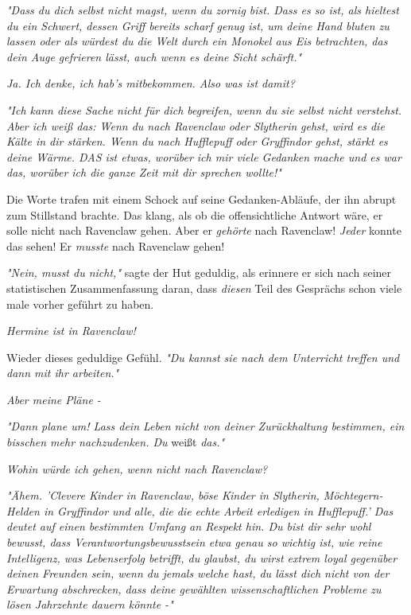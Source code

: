 {\emph{"Dass du dich selbst nicht magst, wenn du zornig bist. Dass es so ist, als hieltest du ein Schwert, dessen Griff bereits scharf genug ist, um deine Hand bluten zu lassen oder als würdest du die Welt durch ein Monokel aus Eis betrachten, das dein Auge gefrieren lässt, auch wenn es deine Sicht schärft."}

\emph{Ja. Ich denke, ich hab's mitbekommen. Also was ist damit?}

\emph{"Ich kann diese Sache nicht für dich begreifen, wenn du sie selbst nicht verstehst. Aber ich weiß das: Wenn du nach Ravenclaw oder Slytherin} \emph{gehst, wird es die Kälte in dir stärken. Wenn du nach Hufflepuff oder Gryffindor gehst, stärkt es deine Wärme. DAS ist etwas, worüber ich mir viele Gedanken mache und es war das, worüber ich die ganze Zeit mit dir sprechen wollte!"}

Die Worte trafen mit einem Schock auf seine Gedanken-Abläufe, der ihn abrupt zum Stillstand brachte. Das klang, als ob die offensichtliche Antwort wäre, er solle nicht nach Ravenclaw gehen. Aber er \emph{gehörte} nach Ravenclaw! \emph{Jeder} konnte das sehen! Er \emph{musste} nach Ravenclaw gehen!

\emph{"Nein, musst du nicht,"} sagte der Hut geduldig, als erinnere er sich nach seiner statistischen Zusammenfassung daran, dass \emph{diesen} Teil des Gesprächs schon viele male vorher geführt zu haben.

\emph{Hermine ist in Ravenclaw!}

Wieder dieses geduldige Gefühl. \emph{"Du kannst sie nach dem Unterricht treffen und dann mit ihr arbeiten."}

\emph{Aber meine Pläne -}

\emph{"Dann plane um! Lass dein Leben nicht von deiner Zurückhaltung bestimmen, ein bisschen mehr nachzudenken. Du} weißt \emph{das."}

\emph{Wohin würde ich gehen, wenn nicht nach Ravenclaw?}

\emph{"Ähem. 'Clevere Kinder in Ravenclaw, böse Kinder in Slytherin, Möchtegern-Helden in Gryffindor und alle, die die echte Arbeit erledigen in Hufflepuff.' Das deutet auf einen bestimmten Umfang an Respekt hin. Du bist dir sehr wohl bewusst, dass Verantwortungsbewusstsein etwa genau so wichtig ist, wie reine Intelligenz, was Lebenserfolg betrifft, du glaubst, du wirst extrem loyal gegenüber deinen Freunden sein, wenn du jemals welche hast, du lässt dich nicht von der Erwartung abschrecken, dass deine gewählten wissenschaftlichen Probleme zu lösen Jahrzehnte dauern könnte -"}

}
